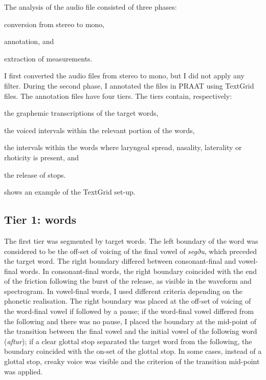 \documentclass[11pt,a4paper,openany]{memoir}\usepackage[]{graphicx}\usepackage[]{color}
\begin{document}
The analysis of the audio file consisted of three phases:
\begin{inparaenum}[(1)]
	\item conversion from stereo to mono,
	\item annotation, and
	\item extraction of measurements.
\end{inparaenum}
I first converted the audio files from stereo to mono, but I did not apply any filter.
During the second phase, I annotated the files in PRAAT \citep{boersma2015} using TextGrid files.
The annotation files have four tiers.
The tiers contain, respectively: 
\begin{inparaenum}[(1)]
	\item the graphemic transcriptions of the target words,
	\item the voiced intervals within the relevant portion of the words, 
	\item the intervals within the words where laryngeal spread, nasality, laterality or rhoticity is present, and
	\item the release of stops.
\end{inparaenum}
 shows an example of the TextGrid set-up.

\subsection{Tier 1: words}

The first tier was segmented by target words.
The left boundary of the word was considered to be the off-set of voicing of the final vowel of \textit{segðu}, which preceded the target word.
The right boundary differed between consonant-final and vowel-final words.
In consonant-final words, the right boundary coincided with the end of the friction following the burst of the release, as visible in the waveform and spectrogram.
In vowel-final words, I used different criteria depending on the phonetic realisation.
The right boundary was placed at the off-set of voicing of the word-final vowel if followed by a pause; if the word-final vowel differed from the following and there was no pause, I placed the boundary at the mid-point of the transition between the final vowel and the initial vowel of the following word (\textit{aftur}); if a clear glottal stop separated the target word from the following, the boundary coincided with the on-set of the glottal stop.
In some cases, instead of a glottal stop, creaky voice was visible and the criterion of the transition mid-point was applied.
\end{document}
